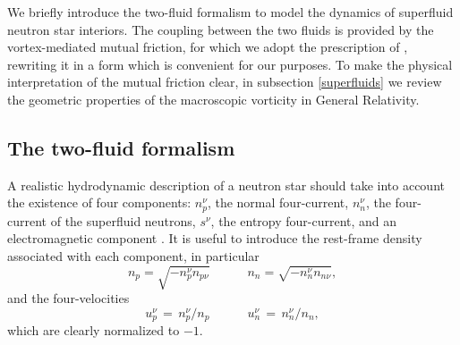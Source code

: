\documentclass[usenatbib%
]{mnras}
\newcommand{\spc}{\quad \quad \quad}
\begin{document}
We briefly introduce the two-fluid formalism  to model the dynamics of superfluid neutron star interiors. The coupling between the two fluids is provided by  the vortex-mediated mutual friction, for which we adopt the prescription of \cite{langlois98}, rewriting it in a form which is convenient for our purposes. To make the physical interpretation of the mutual friction clear, in subsection \ref{superfluids} we review the geometric properties of the macroscopic vorticity in General Relativity.


\subsection{The two-fluid formalism}\label{sec:The two-fluid formalism}

A realistic hydrodynamic description of a neutron star should take into account the existence of four components: $n_p^\nu$, the normal four-current, $n_n^\nu$, the four-current of the superfluid neutrons, $s^\nu$, the entropy four-current, and an electromagnetic component \citep{haskellsedrakian2017,chamel_super}. 
It is useful to introduce the rest-frame density associated with each component, in particular
\begin{equation}
n_p=  \sqrt{- n_p^\nu  n_{p\nu}} \spc n_n=  \sqrt{- n_n^\nu  n_{n\nu}},
\end{equation} 
and the four-velocities 
\begin{equation}
u_p^\nu \, = \, n_p^\nu / n_p \spc u_n^\nu \, = \, n_n^\nu / n_n,
\end{equation}
which are clearly normalized to $-1$.
\end{document}

